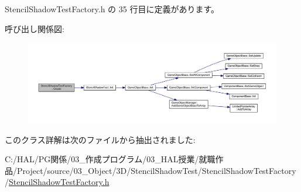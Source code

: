  Stencil\+Shadow\+Test\+Factory.\+h の 35 行目に定義があります。

呼び出し関係図\+:\nopagebreak
\begin{figure}[H]
\begin{center}
\leavevmode
\includegraphics[width=350pt]{class_stencil_shadow_test_factory_a4eec5b125ff810267c784c8a922909a2_cgraph}
\end{center}
\end{figure}


このクラス詳解は次のファイルから抽出されました\+:\begin{DoxyCompactItemize}
\item 
C\+:/\+H\+A\+L/\+P\+G関係/03\+\_\+作成プログラム/03\+\_\+\+H\+A\+L授業/就職作品/\+Project/source/03\+\_\+\+Object/3\+D/\+Stencil\+Shadow\+Test/\+Stencil\+Shadow\+Test\+Factory/\mbox{\hyperlink{_stencil_shadow_test_factory_8h}{Stencil\+Shadow\+Test\+Factory.\+h}}\end{DoxyCompactItemize}
